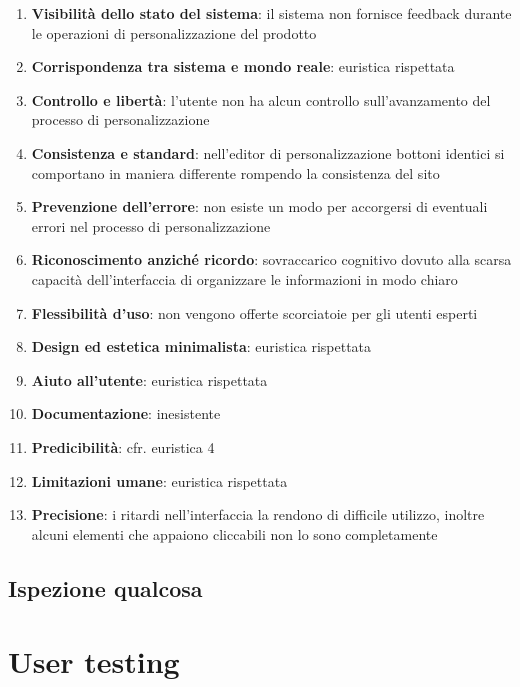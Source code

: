 \documentclass[12pt,italian,]{report}
\providecommand{\tightlist}{%
  \setlength{\itemsep}{0pt}\setlength{\parskip}{0pt}}
\begin{document}
\begin{enumerate}
\def\labelenumi{\arabic{enumi}.}
\tightlist
\item
  \textbf{Visibilità dello stato del sistema}: il sistema non fornisce
  feedback durante le operazioni di personalizzazione del prodotto
\item
  \textbf{Corrispondenza tra sistema e mondo reale}: euristica
  rispettata
\item
  \textbf{Controllo e libertà}: l'utente non ha alcun controllo
  sull'avanzamento del processo di personalizzazione
\item
  \textbf{Consistenza e standard}: nell'editor di personalizzazione
  bottoni identici si comportano in maniera differente rompendo la
  consistenza del sito
\item
  \textbf{Prevenzione dell'errore}: non esiste un modo per accorgersi di
  eventuali errori nel processo di personalizzazione
\item
  \textbf{Riconoscimento anziché ricordo}: sovraccarico cognitivo dovuto
  alla scarsa capacità dell'interfaccia di organizzare le informazioni
  in modo chiaro
\item
  \textbf{Flessibilità d'uso}: non vengono offerte scorciatoie per gli
  utenti esperti
\item
  \textbf{Design ed estetica minimalista}: euristica rispettata
\item
  \textbf{Aiuto all'utente}: euristica rispettata
\item
  \textbf{Documentazione}: inesistente
\item
  \textbf{Predicibilità}: cfr. euristica 4
\item
  \textbf{Limitazioni umane}: euristica rispettata
\item
  \textbf{Precisione}: i ritardi nell'interfaccia la rendono di
  difficile utilizzo, inoltre alcuni elementi che appaiono cliccabili
  non lo sono completamente
\end{enumerate}

\hypertarget{ispezione-qualcosa}{%
\subsection{Ispezione qualcosa}\label{ispezione-qualcosa}}

\hypertarget{user-testing}{%
\section{User testing}\label{user-testing}}
\end{document}
